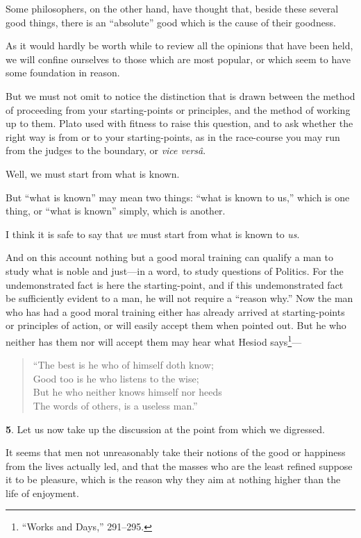 Some philosophers, on the other hand, have thought that, beside these
several good things, there is an ``absolute'' good which is the cause
of their goodness.

As it would hardly be worth while to review all the opinions that have
been held, we will confine ourselves to those which are most popular,
or which seem to have some foundation in reason.

But we must not omit to notice the distinction that is drawn
between the method of proceeding from your starting-points or
principles, and the method of working up to them. Plato used with
fitness to raise this question, and to ask whether the right way is
from or to your starting-points, as in the race-course you may run
from the judges to the boundary, or \textit{vice vers\^a}.

Well, we must start from what is known.

But ``what is known'' may mean two things: ``what is known to us,''
which is one thing, or ``what is known'' simply, which is another.

I think it is safe to say that \textit{we} must start from what is
known to \textit{us}.

And on this account nothing but a good moral training can qualify a
man to study what is noble and just---in a word, to study questions of
Politics. For the undemonstrated fact is here the starting-point, and
if this undemonstrated fact be sufficiently evident to a man, he will
not require a ``reason why.'' Now the man who has had a good moral
training either has already arrived at starting-points or principles
of action, or will easily accept them when pointed out. But he who
neither has them nor will accept them may hear what Hesiod
says\footnote{``Works and Days,'' 291--295.}---

\begin{verse}
``The best is he who of himself doth know;\\
Good too is he who listens to the wise;\\
But he who neither knows himself nor heeds\\
The words of others, is a useless man.''
\end{verse}

\textbf{5}. Let us now take up the discussion at the point from which
we digressed.

It seems that men not unreasonably take their notions of the
good or happiness from the lives actually led, and that the masses who
are the least refined suppose it to be pleasure, which is the reason
why they aim at nothing higher than the life of enjoyment.

